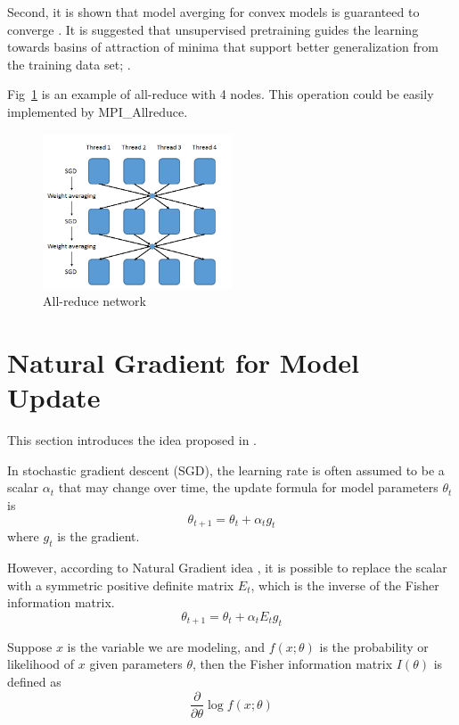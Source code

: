 \documentclass{article}
\begin{document}
Second, it is shown that model averging for convex models is guaranteed to converge \cite{mcdonald2010distributed,mcdonald2009efficient}.
It is suggested that unsupervised pretraining guides the learning towards basins of attraction of minima that support better generalization
from the training data set; \cite{erhan2010does}.

Fig~\ref{fig:allreduce} is an example of all-reduce with 4 nodes. This operation could be easily implemented by MPI\_Allreduce.
\begin{figure}[htb]
  \centering
  \includegraphics[width=0.5\textwidth]{allreduce.png}
  \caption{All-reduce network}
  \label{fig:allreduce}
\end{figure}

\section{Natural Gradient for Model Update}
This section introduces the idea proposed in \cite{povey2014parallel}.

In stochastic gradient descent (SGD), the learning rate is often assumed to be a scalar $\alpha_t$ that may change over time,
the update formula for model parameters $\theta_{t}$ is
\begin{equation}
\theta_{t+1} = \theta_{t} + \alpha_t g_t
\end{equation}
where $g_t$ is the gradient.

However, according to Natural Gradient idea \cite{murata1999statistical,roux2008topmoumoute}, it is possible to replace 
the scalar with a symmetric positive definite matrix $E_t$, which is the inverse of the Fisher information matrix.
\begin{equation}
\theta_{t+1} = \theta_{t} + \alpha_t E_t g_t
\end{equation}

Suppose $x$ is the variable we are modeling, and $f(x;\theta)$ is the probability or likelihood of $x$ given parameters $\theta$, then the
Fisher information matrix $I(\theta)$ is defined as
\begin{equation}
\frac{\partial}{\partial\theta}\log f(x;\theta)
\end{equation}
\end{document}
